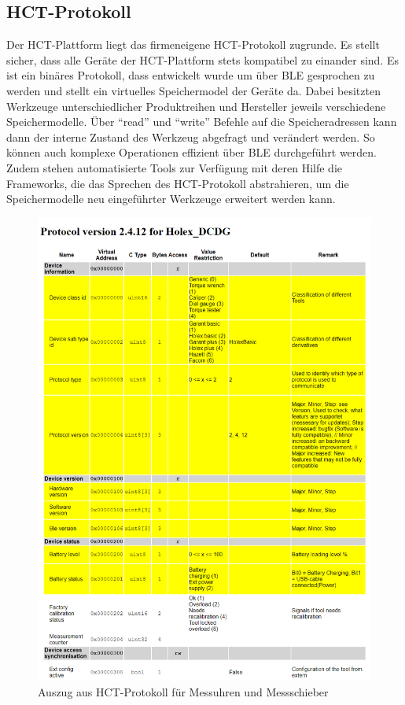 \subsection{HCT-Protokoll}
Der \ac{HCT}-Plattform liegt das firmeneigene \ac{HCT}-Protokoll zugrunde. Es stellt sicher, dass alle Geräte der \ac{HCT}-Plattform stets kompatibel zu einander sind. Es ist ein binäres Protokoll, dass entwickelt wurde um über \ac{BLE} gesprochen zu werden und stellt ein virtuelles Speichermodel der Geräte da. Dabei besitzten Werkzeuge unterschiedlicher Produktreihen und Hersteller jeweils verschiedene Speichermodelle. Über ``read'' und ``write'' Befehle auf die Speicheradressen kann dann der interne Zustand des Werkzeug abgefragt und verändert werden. So können auch komplexe Operationen effizient über \ac{BLE} durchgeführt werden. Zudem stehen automatisierte Tools zur Verfügung mit deren Hilfe die Frameworks, die das Sprechen des HCT-Protokoll abstrahieren, um die Speichermodelle neu eingeführter Werkzeuge erweitert werden kann.
\begin{figure}[H] 
	\centering
	\includegraphics[width=\textwidth]{figures/HCT_Protocol_DCDG.png}
	\caption{Auszug aus \ac{HCT}-Protokoll für Messuhren und Messschieber}
\end{figure}

